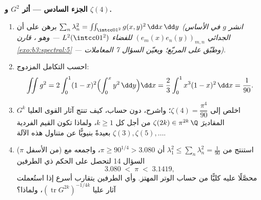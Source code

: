 \begin{problem}
\medskip
\noindent\textbf{الجزء السادس --- أثر $G^2$ و $\zeta(4)$.}
\begin{enumerate}[resume]
  \item برهن على أن $\sum_n\lambda_n^2 =
        \iint_{\intcc01^2}g(x,y)^2\,\dd x\,\dd y$ \emph{(انشر $g$ في الأساس الجدائي
        $(e_m(x)e_n(y))_{m,n}$ للفضاء $L^2(\intcc01^2)$ --- وهو ، قارن
        \cref{exo:b3:spectral:5} --- وطبّق  على المربّع؛ ويعيّن
        السؤال 7 المعاملات)}.
  \item احسب التكامل المزدوج:
        \[
        \iint g^2 = 2\int_0^1(1-x)^2\Bigl(\int_0^x
        y^2\,\dd y\Bigr)\dd x
        = \frac23\int_0^1x^3(1-x)^2\,\dd x = \frac1{90} .
        \]
  \item اخلص إلى $\zeta(4) = \dfrac{\pi^4}{90}$؛ واشرح، دون حساب، كيف تنتج آثار القوى
        العليا $G^k$ المقاديرَ $\zeta(2k) \in \pi^{2k}\,\Q$ من أجل كل $k \geq 1$،
        ولماذا تكون القيم الفردية $\zeta(3),
        \zeta(5), \dots$ بعيدةً بنيويًّا عن
        متناول هذه الآلة.
  \item ($\pi$ من الأسفل) استنتج من $\lambda_1^2 \leq
        \sum_n\lambda_n^2 = \frac1{90}$ أن $\pi \geq
        90^{1/4} > 3.080$،
        واجمعه مع السؤال 14 لتحصل على الحكم ذي الطرفين
        \[
        3.080 \;<\; \pi \;<\; 3.1419,
        \]
        محصَّلًا عليه كليًّا من حساب الوتر المهتز. وأي الطرفين
        يتقارب أسرع إذا استُعملت آثار عليا $(\operatorname{tr}G^{2k})^{-1/4k}$، ولماذا؟
\end{enumerate}


\end{problem}
